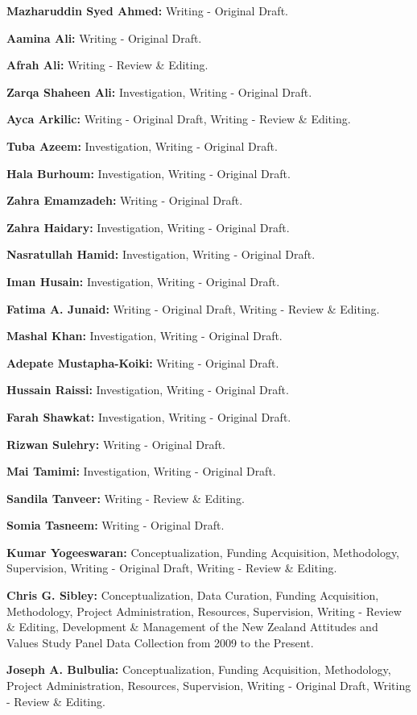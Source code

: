 \documentclass[
]{interact}
\begin{document}
\textbf{Mazharuddin Syed Ahmed:} Writing - Original Draft.

\textbf{Aamina Ali:} Writing - Original Draft.

\textbf{Afrah Ali:} Writing - Review \& Editing.

\textbf{Zarqa Shaheen Ali:} Investigation, Writing - Original Draft.

\textbf{Ayca Arkilic:} Writing - Original Draft, Writing - Review \&
Editing.

\textbf{Tuba Azeem:} Investigation, Writing - Original Draft.

\textbf{Hala Burhoum:} Investigation, Writing - Original Draft.

\textbf{Zahra Emamzadeh:} Writing - Original Draft.

\textbf{Zahra Haidary:} Investigation, Writing - Original Draft.

\textbf{Nasratullah Hamid:} Investigation, Writing - Original Draft.

\textbf{Iman Husain:} Investigation, Writing - Original Draft.

\textbf{Fatima A. Junaid:} Writing - Original Draft, Writing - Review \&
Editing.

\textbf{Mashal Khan:} Investigation, Writing - Original Draft.

\textbf{Adepate Mustapha-Koiki:} Writing - Original Draft.

\textbf{Hussain Raissi:} Investigation, Writing - Original Draft.

\textbf{Farah Shawkat:} Investigation, Writing - Original Draft.

\textbf{Rizwan Sulehry:} Writing - Original Draft.

\textbf{Mai Tamimi:} Investigation, Writing - Original Draft.

\textbf{Sandila Tanveer:} Writing - Review \& Editing.

\textbf{Somia Tasneem:} Writing - Original Draft.

\textbf{Kumar Yogeeswaran:} Conceptualization, Funding Acquisition,
Methodology, Supervision, Writing - Original Draft, Writing - Review \&
Editing.

\textbf{Chris G. Sibley:} Conceptualization, Data Curation, Funding
Acquisition, Methodology, Project Administration, Resources,
Supervision, Writing - Review \& Editing, Development \& Management of
the New Zealand Attitudes and Values Study Panel Data Collection from
2009 to the Present.

\textbf{Joseph A. Bulbulia:} Conceptualization, Funding Acquisition,
Methodology, Project Administration, Resources, Supervision, Writing -
Original Draft, Writing - Review \& Editing.
\end{document}
